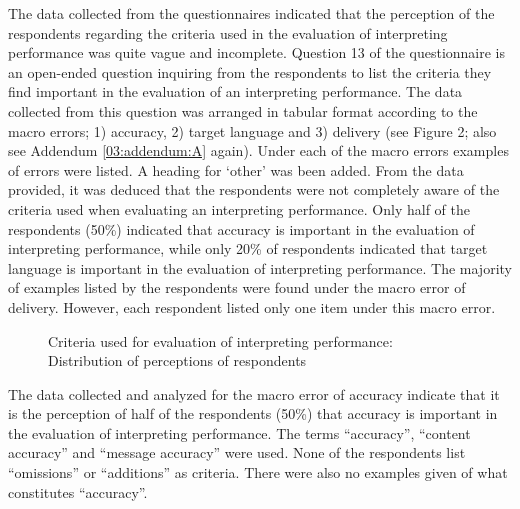 \documentclass[output=paper]{langsci/langscibook}
\begin{document}
The data collected from the questionnaires indicated that the perception of the respondents regarding the criteria used in the evaluation of interpreting performance was quite vague and incomplete. Question 13 of the questionnaire is an open-ended question inquiring from the respondents to list the criteria they find important in the evaluation of an interpreting performance. The data collected from this question was arranged in tabular format according to the macro errors; 1) accuracy, 2) target language and 3) delivery (see Figure 2; also see Addendum \ref{03:addendum:A} again). Under each of the macro errors examples of errors were listed. A heading for ‘other’ was been added. From the data provided, it was deduced that the respondents were not completely aware of the criteria used when evaluating an interpreting performance. Only half of the respondents (50\%) indicated that accuracy is important in the evaluation of interpreting performance, while only 20\% of respondents indicated that target language is important in the evaluation of interpreting performance. The majority of examples listed by the respondents were found under the macro error of delivery. However, each respondent listed only one item under this macro error. 

\begin{figure}
\caption{\label{fig:deysel:2}Criteria used for evaluation of interpreting performance: Distribution of perceptions of respondents}
\end{figure}

The data collected and analyzed for the macro error of accuracy indicate that it is the perception of half of the respondents (50\%) that accuracy is important in the evaluation of interpreting performance. The terms “accuracy”, “content accuracy” and “message accuracy” were used. None of the respondents list “omissions” or “additions” as criteria. There were also no examples given of what constitutes “accuracy”.  
\end{document}
